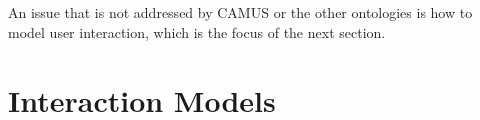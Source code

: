 
An issue that is not addressed by \ac{CAMUS} or the other ontologies is how to model user interaction, which is the focus of the next section.




\section{Interaction Models}
\label{InteractionModels}



